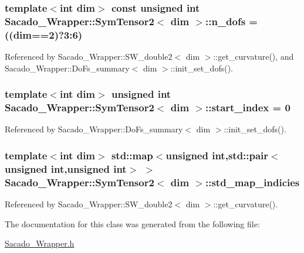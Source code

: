 \subsubsection[{\texorpdfstring{n\+\_\+dofs}{n_dofs}}]{\setlength{\rightskip}{0pt plus 5cm}template$<$int dim$>$ const unsigned {\bf int} {\bf Sacado\+\_\+\+Wrapper\+::\+Sym\+Tensor2}$<$ dim $>$\+::n\+\_\+dofs = ((dim==2)?3\+:6)\hspace{0.3cm}{\ttfamily [static]}}\hypertarget{classSacado__Wrapper_1_1SymTensor2_ad9d6542de5481e0d41bd1831cb0aeaff}{}\label{classSacado__Wrapper_1_1SymTensor2_ad9d6542de5481e0d41bd1831cb0aeaff}


Referenced by Sacado\+\_\+\+Wrapper\+::\+S\+W\+\_\+double2$<$ dim $>$\+::get\+\_\+curvature(), and Sacado\+\_\+\+Wrapper\+::\+Do\+Fs\+\_\+summary$<$ dim $>$\+::init\+\_\+set\+\_\+dofs().

\subsubsection[{\texorpdfstring{start\+\_\+index}{start_index}}]{\setlength{\rightskip}{0pt plus 5cm}template$<$int dim$>$ unsigned {\bf int} {\bf Sacado\+\_\+\+Wrapper\+::\+Sym\+Tensor2}$<$ dim $>$\+::start\+\_\+index = 0}\hypertarget{classSacado__Wrapper_1_1SymTensor2_ab14d036243a7505e918af354b1cb74d9}{}\label{classSacado__Wrapper_1_1SymTensor2_ab14d036243a7505e918af354b1cb74d9}


Referenced by Sacado\+\_\+\+Wrapper\+::\+Do\+Fs\+\_\+summary$<$ dim $>$\+::init\+\_\+set\+\_\+dofs().

\subsubsection[{\texorpdfstring{std\+\_\+map\+\_\+indicies}{std_map_indicies}}]{\setlength{\rightskip}{0pt plus 5cm}template$<$int dim$>$ std\+::map$<$unsigned {\bf int},std\+::pair$<$unsigned {\bf int},unsigned {\bf int}$>$ $>$ {\bf Sacado\+\_\+\+Wrapper\+::\+Sym\+Tensor2}$<$ dim $>$\+::std\+\_\+map\+\_\+indicies}\hypertarget{classSacado__Wrapper_1_1SymTensor2_a1c6b89438714315ae209f4687b687505}{}\label{classSacado__Wrapper_1_1SymTensor2_a1c6b89438714315ae209f4687b687505}


Referenced by Sacado\+\_\+\+Wrapper\+::\+S\+W\+\_\+double2$<$ dim $>$\+::get\+\_\+curvature().



The documentation for this class was generated from the following file\+:\begin{DoxyCompactItemize}
\item 
\hyperlink{Sacado__Wrapper_8h}{Sacado\+\_\+\+Wrapper.\+h}\end{DoxyCompactItemize}
